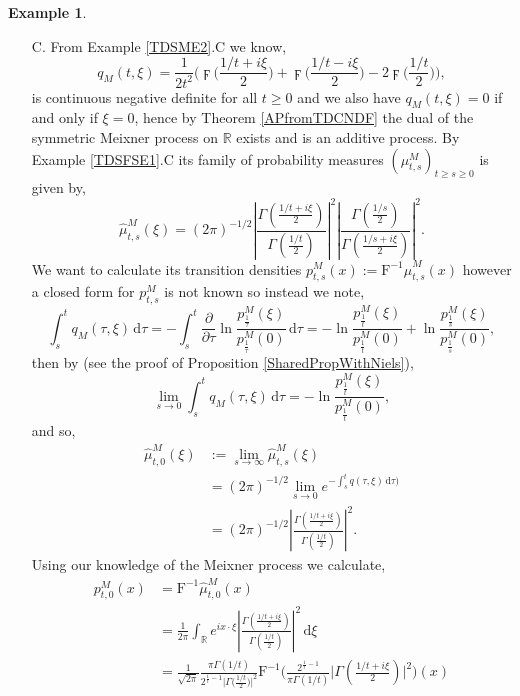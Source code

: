 \documentclass[a4paper, 12pt]{report}
\theoremstyle{remark}
\theoremstyle{definition}
\newtheorem{example}[theorem]{Example}
\begin{document}
\begin{example}
\begin{itemize}
\item[C.]  From Example \ref{TDSME2}.C we know,
$$
q_M(t, \xi) = \frac{1}{2t^2}\Bigg(\digamma\bigg(\frac{1/t + i\xi}{2}\bigg) + \digamma\bigg(\frac{1/t - i\xi}{2}\bigg) - 2\digamma\bigg(\frac{1/t}{2}\bigg)\Bigg),
$$
is continuous negative definite for all $t \ge 0$ and we also have $q_M(t, \xi) = 0$ if and only if $\xi = 0$, hence by Theorem \ref{APfromTDCNDF} the dual of the symmetric Meixner process on $\mathbb{R}$ exists and is an additive process.  By Example \ref{TDSFSE1}.C its family of probability measures $(\mu_{t, s}^M)_{t \ge s \ge 0}$ is given by,
$$
\hat{\mu}_{t, s}^M(\xi) = (2\pi)^{-1/2}\left|\frac{\Gamma\left(\frac{1/t + i\xi}{2}\right)}{\Gamma\left(\frac{1/t}{2}\right)}\right|^2 \left|\frac{\Gamma\left(\frac{1/s}{2}\right)}{\Gamma\left(\frac{1/s + i\xi}{2}\right)}\right|^2.
$$
We want to calculate its transition densities $p_{t, s}^M(x) := \mathrm{F}^{-1}\hat{\mu}_{t, s}^M(x)$ however a closed form for $p_{t, s}^M$ is not known so instead we note,
$$
\int_s^tq_M(\tau, \xi)\,\mathrm{d}\tau = -\int_s^t\frac{\partial}{\partial\tau}\ln\frac{p_\frac{1}{\tau}^M(\xi)}{p_\frac{1}{\tau}^M(0)}\,\mathrm{d}\tau = -\ln\frac{p_\frac{1}{t}^M(\xi)}{p_\frac{1}{t}^M(0)} + \ln\frac{p_\frac{1}{s}^M(\xi)}{p_\frac{1}{s}^M(0)},
$$
then by \cite[Theorem 14]{DProofPaper} (see the proof of Proposition \ref{SharedPropWithNiels}),
$$
\lim_{s \to 0}\int_s^tq_M(\tau, \xi)\,\mathrm{d}\tau = -\ln\frac{p_\frac{1}{t}^M(\xi)}{p_\frac{1}{t}^M(0)},
$$
and so,
$$
\begin{aligned}
\hat{\mu}_{t, 0}^M(\xi) & := \lim_{s \to \infty}\hat{\mu}_{t, s}^M(\xi)\\
& = (2\pi)^{-1/2}\lim_{s \to 0}e^{-\int_s^tq(\tau, \xi)\,\mathrm{d}\tau)}\\
& = (2\pi)^{-1/2}\left|\frac{\Gamma\left(\frac{1/t + i\xi}{2}\right)}{\Gamma\left(\frac{1/t}{2}\right)}\right|^2.
\end{aligned}
$$
Using our knowledge of the Meixner process we calculate,
$$
\begin{aligned}
p_{t, 0}^M(x) & = \mathrm{F}^{-1}\hat{\mu}_{t, 0}^M(x)\\
& = \frac{1}{2\pi}\int_{\mathbb{R}}e^{ix\cdot\xi}\left|\frac{\Gamma\left(\frac{1/t + i\xi}{2}\right)}{\Gamma\left(\frac{1/t}{2}\right)}\right|^2\,\mathrm{d}\xi\\
& = \frac{1}{\sqrt{2\pi}}\frac{\pi\Gamma(1/t)}{2^{\frac{1}{t} - 1}\big|\Gamma\big(\frac{1/t}{2}\big)\big|^2}\mathrm{F}^{-1}\Bigg(\frac{2^{\frac{1}{t} - 1}}{\pi\Gamma(1/t)}\bigg|\Gamma\left(\frac{1/t + i\xi}{2}\right)\bigg|^2\Bigg)(x)\\

\end{aligned}$$
\end{itemize}
\end{example}
\end{document}
